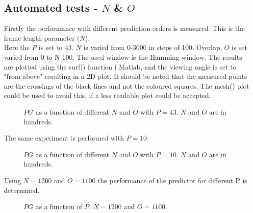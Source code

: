 \subsection{Automated tests - $N$ \& $O$}
Firstly the performance with different prediction orders is measured. This is the frame length parameter ($N$). \\ 
Here the $P$ is set to 43. $N$ is varied from 0-3000 in steps of 100. Overlap, $O$ is set varied from 0 to N-100. The used window is the Hamming window. The results are plotted using the surf() function i Matlab, and the viewing angle is set to "from above" resulting in a 2D plot. It should be noted that the measured points are the crossings of the black lines and not the coloured squares. The mesh() plot could be used to avoid this, if a less readable plot could be accepted. 

\begin{figure}[H]
	\centering
	
	\caption{$PG$ as a function of different $N$ and $O$ with $P=43$. $N$ and $O$ are in hundreds.}
	\label{fig:Predict43App}
\end{figure}

The same experiment is performed with $P=10$.
\begin{figure}[H]
	\centering
	
	\caption{$PG$ as a function of different $N$ and $O$ with $P=10$. $N$ and $O$ are in hundreds.}
	\label{fig:Predict10App}
\end{figure}

Using $N=1200$ and $O=1100$ the performance of the predictor for different P is determined. 
\begin{figure}[H]
	\centering
	
	\caption{$PG$ as a function of $P$. $N=1200$ and $O=1100$}
	\label{fig:PredictPApp}
\end{figure}

